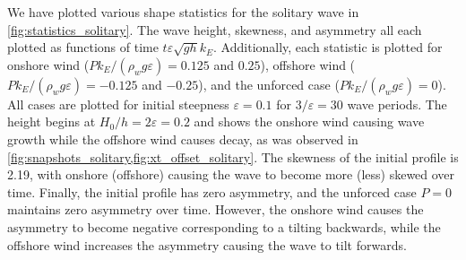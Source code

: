\documentclass{jfm}
\renewcommand*{\epsilon}{\varepsilon}
\begin{document}
We have plotted various shape statistics for the solitary wave in
\cref{fig:statistics_solitary}.
The  wave height,
 skewness, and
 asymmetry all each plotted as
functions of time $t \epsilon \sqrt{g h} k_E$.
Additionally, each statistic is plotted for onshore wind ($P
k_E/(\rho_w g \epsilon) = 0.125$ and $0.25$), offshore wind ($P
k_E/(\rho_w g \epsilon) = -0.125$ and $-0.25$), and the unforced case
($P k_E/(\rho_w g \epsilon) = 0$).
All cases are plotted for initial steepness $\epsilon = 0.1$ for
$3/\epsilon = 30$ wave periods.
The height  begins at $H_0/h = 2
\epsilon = 0.2$ and shows the onshore wind
causing wave growth while the offshore wind causes decay, as was
observed in \cref{fig:snapshots_solitary,fig:xt_offset_solitary}.
The skewness of the initial profile is \num{2.19}, with onshore
(offshore) causing the wave to become more (less) skewed over time.
Finally, the initial profile has zero asymmetry, and the unforced case
$P=0$ maintains zero asymmetry over time.
However, the onshore wind causes the asymmetry to become negative
corresponding to a tilting backwards, while the offshore wind increases
the asymmetry causing the wave to tilt forwards.

\appendix
\end{document}
